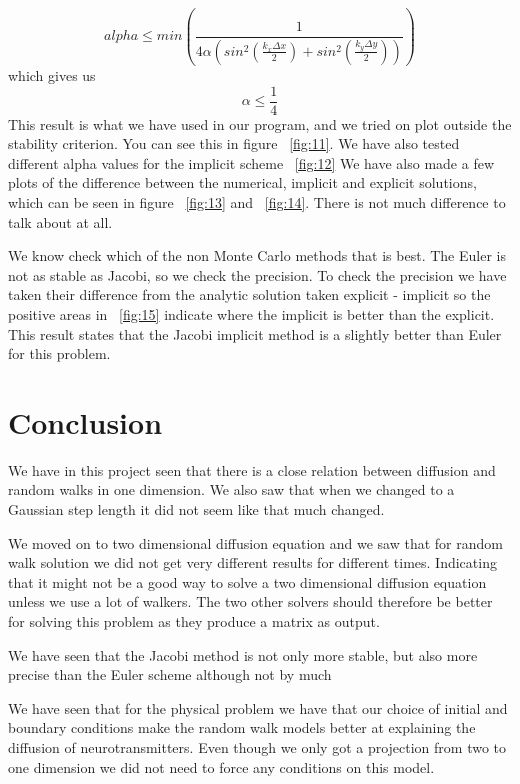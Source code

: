 \documentclass[a4wide,12pt]{article}
\begin{document}
 \[
 alpha \le min(\frac{1}{4\alpha(sin^{2}(\frac{k_{x}\Delta x}{2})+sin^{2}(\frac{k_{y}\Delta y}{2}))})
 \]
 which gives us
 \[
 \alpha \le \frac{1}{4}
 \]
 This result is what we have used in our program, and we tried on plot outside the stability criterion. You can see this in figure ~\ref{fig:11}. We have also tested different alpha values for the implicit scheme ~\ref{fig:12}
 We have also made a few plots of the difference between the numerical, implicit and explicit solutions, which can be seen in figure ~\ref{fig:13} and ~\ref{fig:14}. There is not much difference to talk about at all.
 
We know check which of the non Monte Carlo methods that is best. The Euler is not as stable as Jacobi, so we check the precision. To check the precision
we have taken their difference from the analytic solution taken explicit - implicit so the positive areas in ~\ref{fig:15} indicate where the implicit is better than the explicit.
This result states that the Jacobi implicit method is a slightly better than Euler for this problem. 
\section*{Conclusion}
We have in this project seen that there is a close relation between diffusion and random walks in one dimension. We also saw that when we changed to a Gaussian step length it did not seem like that much changed. 

We moved on to two dimensional diffusion equation and we saw that for random walk solution we did not get very different results for different times. Indicating that it might not be a good way to solve a two dimensional diffusion equation unless we use a lot of walkers. 
The two other solvers should therefore be better for solving this problem as they produce a matrix as output. 

We have seen that the Jacobi method is not only more stable, but also more precise than the Euler scheme although not by much

We have seen that for the physical problem we have that our choice of initial
and boundary conditions make the random walk models better at explaining
the diffusion of neurotransmitters. 
Even though we only got a projection from two to one dimension we did not need to force any conditions on
this model. 
\end{document}
